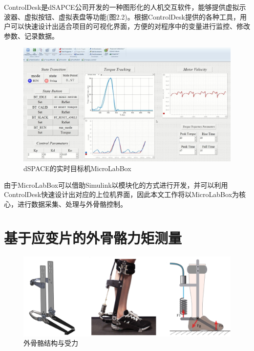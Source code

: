 ControlDesk是dSAPCE公司开发的一种图形化的人机交互软件，能够提供虚拟示波器、虚拟按钮、虚拟表盘等功能(图2.2)。根据ControlDesk提供的各种工具，用户可以快速设计出适合项目的可视化界面，方便的对程序中的变量进行监控、修改参数、记录数据。
\begin{figure}[htb]
    \includegraphics[width=14cm]{fig/f22.jpg}
    \caption{dSPACE的实时目标机MicroLabBox}
    \label{fig:mark}
\end{figure}

由于MicroLabBox可以借助Simulink以模块化的方式进行开发，并可以利用ControlDesk快速设计出对应的上位机界面，因此本文工作将以MicroLabBox为核心，进行数据采集、处理与外骨骼控制。

\section{基于应变片的外骨骼力矩测量}
\begin{figure}[htb]
    \includegraphics[width=14cm]{fig/f23.jpg}
    \caption{外骨骼结构与受力}
    \label{fig:mark}
\end{figure}

